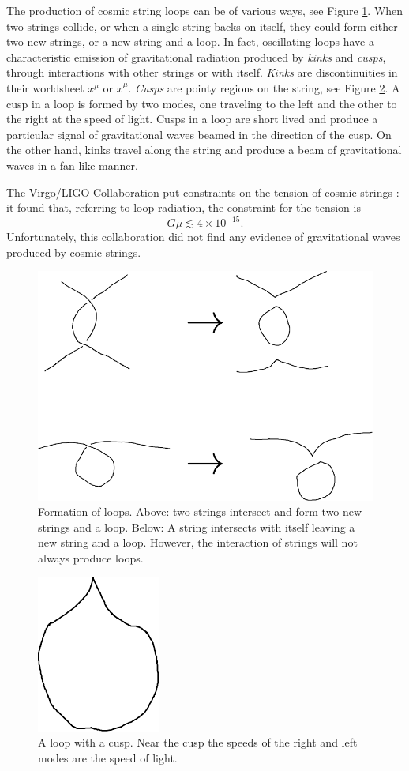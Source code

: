 The production of cosmic string loops can be of various ways, see Figure \ref{fig:loops}. When two strings collide, or when a single string backs on itself, they could form either two new strings, or a new string and a loop. In fact, oscillating loops have a characteristic emission of gravitational radiation produced by \textit{kinks} and \textit{cusps}, through interactions with other strings or with itself. \textit{Kinks} are discontinuities in their worldsheet $x^{\mu}$ or $\dot{x}^{\mu}$. \textit{Cusps} are pointy regions on the string, see Figure \ref{fig:cusp}. A cusp in a loop is formed by two modes, one traveling to the left and the other to the right at the speed of light. Cusps in a loop are short lived and produce a particular signal of gravitational waves beamed in the direction of the cusp. On the other hand, kinks travel along the string and produce a beam of gravitational waves in a fan-like manner.

The Virgo/LIGO Collaboration put constraints on the tension of cosmic strings \cite{PhysRevLett.126.241102}: it found that, referring to loop radiation, the constraint for the tension is
\begin{equation}
	G\mu \lesssim 4\times10^{-15}.
\end{equation}
Unfortunately, this collaboration did not find any evidence of gravitational waves produced by cosmic strings.

\begin{figure}
	\centering
	\includegraphics[scale=1]{./figures/kinks.pdf}
	\caption{Formation of loops. Above: two strings intersect and form two new strings and a loop. Below: A string intersects with itself leaving a new string and  a loop. However, the interaction of strings will not always produce loops.}
		\label{fig:loops}
\end{figure}


\begin{figure}
	\centering
	\includegraphics[scale=1.5]{./figures/cusp.pdf}
	\caption{A loop with a cusp. Near the cusp the speeds of the right and left modes are the speed of light.}
		\label{fig:cusp}
\end{figure}